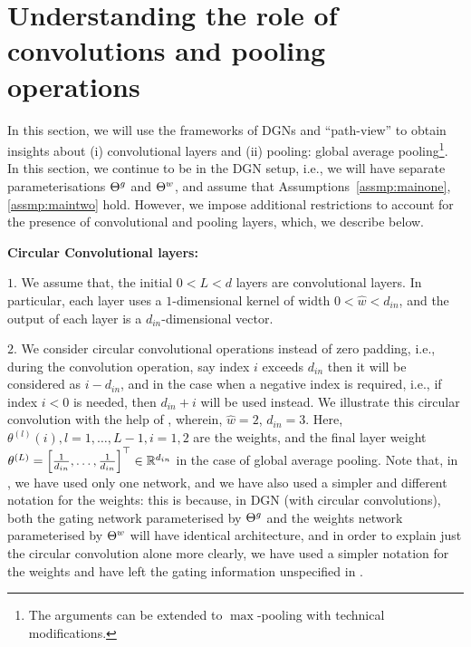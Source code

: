 \section{Understanding the role of convolutions and pooling operations}\label{sec:conv}
In this section, we will use the frameworks of DGNs and ``path-view'' to obtain insights about (i) convolutional layers and (ii) pooling: global average pooling\footnote{The arguments can be extended to $\max$-pooling with technical modifications.}. In this section, we continue to be in the DGN setup, i.e., we will have separate parameterisations ${\Theta}^g$ and ${\Theta}^w$, and assume that Assumptions~\ref{assmp:mainone}, \ref{assmp:maintwo} hold. However, we impose additional restrictions to account for the presence of convolutional and pooling layers, which, we describe below.

\textbf{Circular Convolutional layers:}

$1.$ We assume that, the initial $0<L<d$ layers are convolutional layers. In particular, each layer uses a $1$-dimensional kernel of width $0<\hat{w}<d_{in}$, and the output of each layer is a $d_{in}$-dimensional vector.

$2.$ We consider circular convolutional operations instead of zero padding, i.e., during the convolution operation, say index $i$ exceeds $d_{in}$ then it will be considered as $i-d_{in}$, and in the case when a negative index is required, i.e., if index $i<0$ is needed, then $d_{in}+i$ will be used instead. We illustrate this circular convolution with the help of , wherein, $\hat{w}=2$, $d_{in}=3$. Here, $\theta^{(l)}(i),l=1,\ldots,L-1, i=1,2$ are the weights, and the final layer weight $\theta^{(L)}=\left[\frac{1}{d_{in}},\ldots, \frac{1}{d_{in}}\right]^\top\in \mathbb{R}^{d_{in}}$ in the case of global average pooling. Note that, in , we have used only one network, and we have also used a simpler and different notation for the weights: this is because, in DGN (with circular convolutions), both the gating network parameterised by ${\Theta}^g$ and the weights network parameterised by ${\Theta}^w$ will have identical architecture, and in order to explain just the circular convolution alone more clearly, we have used a simpler notation for the weights and have left the gating information unspecified in .

